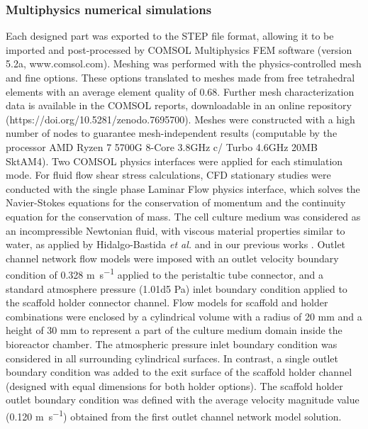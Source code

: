\subsubsection{Multiphysics numerical simulations}
Each designed part was exported to the \acs{STEP} file format, allowing it to be imported and post-processed by COMSOL Multiphysics \acs{FEM} software (version 5.2a, www.comsol.com). Meshing was performed with the physics-controlled mesh and fine options. These options translated to meshes made from free tetrahedral elements with an average element quality of 0.68. Further mesh characterization data is available in the COMSOL reports, downloadable in an online repository (https://doi.org/10.5281/zenodo.7695700). Meshes were constructed with a high number of nodes to guarantee mesh-independent results (computable by the processor AMD Ryzen 7 5700G 8-Core 3.8GHz c/ Turbo 4.6GHz 20MB SktAM4). Two COMSOL physics interfaces were applied for each stimulation mode. For fluid flow shear stress calculations, \acs{CFD} stationary studies were conducted with the single phase Laminar Flow physics interface, which solves the Navier-Stokes equations for the conservation of momentum and the continuity equation for the conservation of mass. The cell culture medium was considered as an incompressible Newtonian fluid, with viscous material properties similar to water, as applied by Hidalgo-Bastida \textit{et al.} \cite{Hidalgo-Bastida2012-tp} and in our previous works \cite{Meneses2020-dx, Meneses2022-rx}. Outlet channel network flow models were imposed with an outlet velocity boundary condition of 0.328 \unit{\meter\per\second} applied to the peristaltic tube connector, and a standard atmosphere pressure (\num{1.01d5} \unit{\pascal}) inlet boundary condition applied to the scaffold holder connector channel. Flow models for scaffold and holder combinations were enclosed by a cylindrical volume with a radius of 20 \unit{\milli\meter} and a height of 30 \unit{\milli\meter} to represent a part of the culture medium domain inside the bioreactor chamber. The atmospheric pressure inlet boundary condition was considered in all surrounding cylindrical surfaces. In contrast, a single outlet boundary condition was added to the exit surface of the scaffold holder channel (designed with equal dimensions for both holder options). The scaffold holder outlet boundary condition was defined with the average velocity magnitude value (0.120 \unit{\meter\per\second}) obtained from the first outlet channel network model solution.


